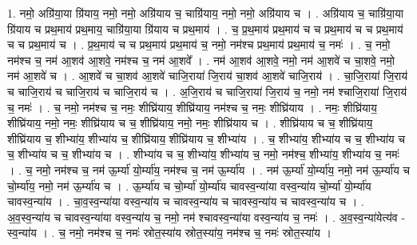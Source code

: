 \documentclass[17pt]{extarticle}
\begin{document}
1. नमो॒ अग्रि॑या॒या ग्रि॑याय॒ नमो॒ नमो॒ अग्रि॑याय च॒ चाग्रि॑याय॒ नमो॒ नमो॒ अग्रि॑याय च । . अग्रि॑याय च॒ चाग्रि॑या॒या ग्रि॑याय च प्रथ॒माय॑ प्रथ॒माय॒ चाग्रि॑या॒या ग्रि॑याय च प्रथ॒माय॑ । . च॒ प्र॒थ॒माय॑ प्रथ॒माय॑ च च प्रथ॒माय॑ च च प्रथ॒माय॑ च च प्रथ॒माय॑ च । . प्र॒थ॒माय॑ च च प्रथ॒माय॑ प्रथ॒माय॑ च॒ नमो॒ नम॑श्च प्रथ॒माय॑ प्रथ॒माय॑ च॒ नमः॑ । . च॒ नमो॒ नम॑श्च च॒ नम॑ आ॒शव॑ आ॒शवे॒ नम॑श्च च॒ नम॑ आ॒शवे᳚ । . नम॑ आ॒शव॑ आ॒शवे॒ नमो॒ नम॑ आ॒शवे॑ च चा॒शवे॒ नमो॒ नम॑ आ॒शवे॑ च । . आ॒शवे॑ च चा॒शव॑ आ॒शवे॑ चाजि॒राया॑ जि॒राय॑ चा॒शव॑ आ॒शवे॑ चाजि॒राय॑ । . चा॒जि॒राया॑ जि॒राय॑ च चाजि॒राय॑ च चाजि॒राय॑ च चाजि॒राय॑ च । . अ॒जि॒राय॑ च चाजि॒राया॑ जि॒राय॑ च॒ नमो॒ नम॑ श्चाजि॒राया॑ जि॒राय॑ च॒ नमः॑ । . च॒ नमो॒ नम॑श्च च॒ नमः॒ शीघ्रि॑याय॒ शीघ्रि॑याय॒ नम॑श्च च॒ नमः॒ शीघ्रि॑याय । . नमः॒ शीघ्रि॑याय॒ शीघ्रि॑याय॒ नमो॒ नमः॒ शीघ्रि॑याय च च॒ शीघ्रि॑याय॒ नमो॒ नमः॒ शीघ्रि॑याय च । . शीघ्रि॑याय च च॒ शीघ्रि॑याय॒ शीघ्रि॑याय च॒ शीभ्या॑य॒ शीभ्या॑य च॒ शीघ्रि॑याय॒ शीघ्रि॑याय च॒ शीभ्या॑य । . च॒ शीभ्या॑य॒ शीभ्या॑य च च॒ शीभ्या॑य च च॒ शीभ्या॑य च च॒ शीभ्या॑य च । . शीभ्या॑य च च॒ शीभ्या॑य॒ शीभ्या॑य च॒ नमो॒ नम॑श्च॒ शीभ्या॑य॒ शीभ्या॑य च॒ नमः॑ । . च॒ नमो॒ नम॑श्च च॒ नम॑ ऊ॒र्म्या॑ यो॒र्म्या॑य॒ नम॑श्च च॒ नम॑ ऊ॒र्म्या॑य । . नम॑ ऊ॒र्म्या॑ यो॒र्म्या॑य॒ नमो॒ नम॑ ऊ॒र्म्या॑य च चो॒र्म्या॑य॒ नमो॒ नम॑ ऊ॒र्म्या॑य च । . ऊ॒र्म्या॑य च चो॒र्म्या॑ यो॒र्म्या॑य चावस्व॒न्या॑या वस्व॒न्या॑य चो॒र्म्या॑ यो॒र्म्या॑य चावस्व॒न्या॑य । . चा॒व॒स्व॒न्या॑या वस्व॒न्या॑य च चावस्व॒न्या॑य च चावस्व॒न्या॑य च चावस्व॒न्या॑य च । . अ॒व॒स्व॒न्या॑य च चावस्व॒न्या॑या वस्व॒न्या॑य च॒ नमो॒ नम॑ श्चावस्व॒न्या॑या वस्व॒न्या॑य च॒ नमः॑ । . अ॒व॒स्व॒न्या॑येत्य॑व - स्व॒न्या॑य । . च॒ नमो॒ नम॑श्च च॒ नमः॑ स्रोत॒स्या॑य स्रोत॒स्या॑य॒ नम॑श्च च॒ नमः॑ स्रोत॒स्या॑य । \newline
\end{document}
